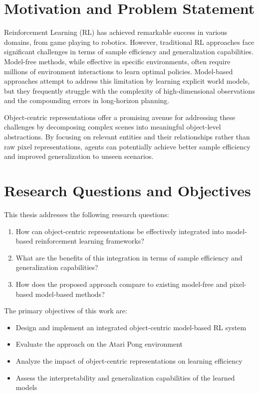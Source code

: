 \documentclass[
	english,
	ruledheaders=section,
	class=report,
	thesis={type=master},
	accentcolor=9c,
	custommargins=true,
	marginpar=false,
	parskip=half-,
	fontsize=11pt,
]{tudapub}
\begin{document}
\section{Motivation and Problem Statement}
\label{sec:motivation}

Reinforcement Learning (RL) has achieved remarkable success in various domains, from game playing to robotics. However, traditional RL approaches face significant challenges in terms of sample efficiency and generalization capabilities. Model-free methods, while effective in specific environments, often require millions of environment interactions to learn optimal policies. Model-based approaches attempt to address this limitation by learning explicit world models, but they frequently struggle with the complexity of high-dimensional observations and the compounding errors in long-horizon planning.

Object-centric representations offer a promising avenue for addressing these challenges by decomposing complex scenes into meaningful object-level abstractions. By focusing on relevant entities and their relationships rather than raw pixel representations, agents can potentially achieve better sample efficiency and improved generalization to unseen scenarios.

 \section{Research Questions and Objectives}
\label{sec:research_questions}

This thesis addresses the following research questions:
\begin{enumerate}
    \item How can object-centric representations be effectively integrated into model-based reinforcement learning frameworks?
    \item What are the benefits of this integration in terms of sample efficiency and generalization capabilities?
    \item How does the proposed approach compare to existing model-free and pixel-based model-based methods?
\end{enumerate}

The primary objectives of this work are:
\begin{itemize}
    \item Design and implement an integrated object-centric model-based RL system
    \item Evaluate the approach on the Atari Pong environment
    \item Analyze the impact of object-centric representations on learning efficiency
    \item Assess the interpretability and generalization capabilities of the learned models
\end{itemize}
\end{document}

